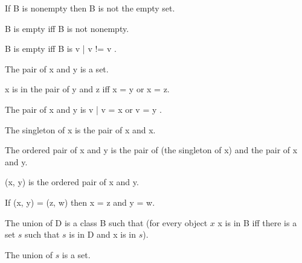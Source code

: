 \documentclass{article}
\begin{document}
\begin{forthel}
    \begin{lemma}
      If B is nonempty then B is not the empty set.
    \end{lemma}

    \begin{definition}
      B is empty iff B is not nonempty.
    \end{definition}

    \begin{lemma}
      B is empty iff B is { v | v != v }.
    \end{lemma}

    \begin{signature}
      The pair of x and y is a set.
    \end{signature}

    \begin{axiom}[Pair]
      x is in the pair of y and z iff x = y or x = z.
    \end{axiom}

    \begin{lemma}
      The pair of x and y is { v | v = x or v = y }.
    \end{lemma}

    \begin{definition}
      The singleton of x is the pair of x and x.
    \end{definition}

    \begin{definition}
      The ordered pair of x and y is the pair of (the singleton of x) and the pair of x and y.
    \end{definition}

    \begin{definition}
      (x, y) is the ordered pair of x and y.
    \end{definition}

    \begin{lemma}[OrdPair]
      If (x, y) = (z, w) then x = z and y = w.
    \end{lemma}

    \begin{definition}
      The union of D is a class B such that (for every object $x$ x is in B iff there is a set $s$ 
        such that $s$ is in D and x is in $s$).
    \end{definition}

    \begin{axiom}[Union]
      The union of $s$ is a set.
    \end{axiom}


\end{forthel}
\end{document}
